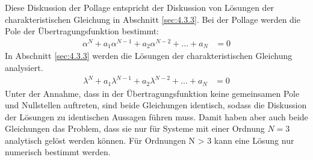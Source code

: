 Diese Diskussion der Pollage entspricht der Diskussion von Lösungen der charakteristischen Gleichung in Abschnitt \ref{sec:4.3.3}. Bei der Pollage werden die Pole der Übertragungsfunktion bestimmt:
\begin{align}
\alpha^{N} + a_{1}  \alpha^{N - 1} + a_{2}  \alpha^{N - 2} + ... + a_{N} &= 0 \label{eq:6.123}
\end{align}
In Abschnitt \ref{sec:4.3.3} werden die Lösungen der charakteristischen Gleichung analysiert.
\begin{align}
\lambda^{N} + a_{1}  \lambda^{N - 1} + a_{2}  \lambda^{N - 2} + ... + a_{N} &= 0 \label{eq:6.124}
\end{align}
Unter der Annahme, dass in der Übertragungsfunktion keine gemeinsamen Pole und Nullstellen auftreten, sind beide Gleichungen identisch, sodass die Diskussion der Lösungen zu identischen Aussagen führen muss. Damit haben aber auch beide Gleichungen das Problem, dass sie nur für Systeme mit einer Ordnung \(N = 3\) analytisch gelöst werden können. Für Ordnungen N \textgreater{} 3 kann eine Lösung nur numerisch bestimmt werden.
